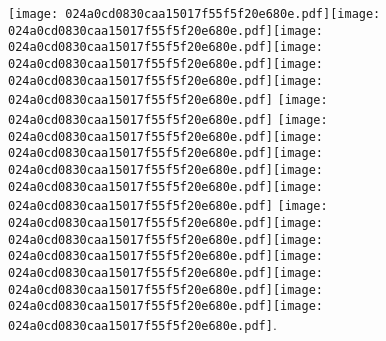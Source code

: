 \documentclass{article}
\newcommand{\origpg}[2]{\texttt{[image: 024a0cd0830caa15017f55f5f20e680e.pdf]}}
\begin{document}
{\vspace{0.626pt}\hspace{36.161pt}\origpg4{121.46pt 397.12pt 128.52pt 413.26pt}\hspace{-0.307pt}\origpg4{128.21pt 397.12pt 136.28pt 413.26pt}\hspace{-0.355pt}\origpg4{135.93pt 397.12pt 143.98pt 413.26pt}\origpg4{143.88pt 397.12pt 151.24pt 413.26pt}\origpg4{151.34pt 397.12pt 159.18pt 413.26pt}\hspace{-0.613pt}\origpg4{158.57pt 397.12pt 166.64pt 413.26pt} \origpg4{170.61pt 397.12pt 178.23pt 413.26pt} \origpg4{182.17pt 397.12pt 190.24pt 413.26pt}\hspace{-0.355pt}\origpg4{189.88pt 397.12pt 196.26pt 413.26pt}\hspace{-0.113pt}\origpg4{196.14pt 397.12pt 204.2pt 413.26pt}\origpg4{204.1pt 397.12pt 211.27pt 413.26pt}\origpg4{211.32pt 397.12pt 219.39pt 413.26pt} \origpg4{223.36pt 397.12pt 231.43pt 413.26pt}\origpg4{231.52pt 397.12pt 238.69pt 413.26pt}\hspace{-0.178pt}\origpg4{238.51pt 397.12pt 250.94pt 413.26pt}\origpg4{251.02pt 397.12pt 258.19pt 413.26pt}\hspace{-0.178pt}\origpg4{258.01pt 397.12pt 265.06pt 413.26pt}\origpg4{265pt 397.12pt 272.84pt 413.26pt}\origpg4{272.94pt 397.12pt 281.58pt 413.26pt}. 

}
\end{document}
